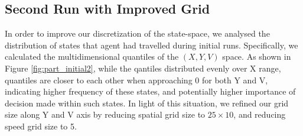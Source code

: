 \documentclass[11pt]{article}
\theoremstyle{definition}
\begin{document}
\subsection{\textbf{Second Run with Improved Grid}}
In order to improve our discretization of the state-space, we analysed the distribution of states that agent had travelled during initial runs. Specifically, we calculated the multidimensional quantiles of the $(X, Y, V)$ space. As shown in Figure \ref{fig:part_initial2}, while the qantiles distributed evenly over X range, quantiles are closer to each other when approaching 0 for both Y and V, indicating higher frequency of these states, and potentially higher importance of decision made within such states. In light of this situation, we refined our grid size along Y and V axis by reducing spatial grid size to $25 \times 10$, and reducing speed grid size to 5.
\end{document}
